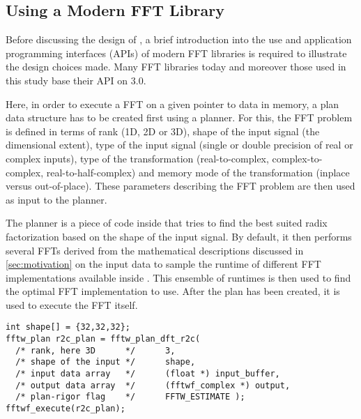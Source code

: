 
\subsection{Using a Modern FFT Library}
\label{ssec:modern_ffts}
Before discussing the design of \gearshifft{}, a brief introduction into the use and application programming interfaces (APIs) of modern FFT libraries is required to illustrate the design choices made. Many FFT libraries today and moreover those used in this study base their API on \fftw{} $3.0$. 

Here, in order to execute a FFT on a given pointer to data in memory, a plan data structure has to be created first using a planner. For this, the FFT problem is defined in terms of rank (1D, 2D or 3D), shape of the input signal (the dimensional extent), type of the input signal (single or double precision of real or complex inputs), type of the transformation (real-to-complex, complex-to-complex, real-to-half-complex) and memory mode of the transformation (inplace versus out-of-place). These parameters describing the FFT problem are then used as input to the planner. 

The planner is a piece of code inside \fftw{} that tries to find the best suited radix factorization based on the shape of the input signal. By default, it then performs several FFTs derived from the mathematical descriptions discussed in \cref{sec:motivation} on the input data to sample the runtime of different FFT implementations available inside \fftw{}. This ensemble of runtimes is then used to find the optimal FFT implementation to use. After the plan has been created, it is used to execute the FFT itself.

\begin{lstlisting}[caption={Minimal usage example of the \fftw{} single precision real-to-complex planner API. Memory management is omitted.},label={lst:fftw_example}]
int shape[] = {32,32,32};
fftw_plan r2c_plan = fftw_plan_dft_r2c(
  /* rank, here 3D      */		3,                       
  /* shape of the input */		shape,                   
  /* input data array   */		(float *) input_buffer,  
  /* output data array  */		(fftwf_complex *) output,
  /* plan-rigor flag    */		FFTW_ESTIMATE );         
fftwf_execute(r2c_plan);
\end{lstlisting}

